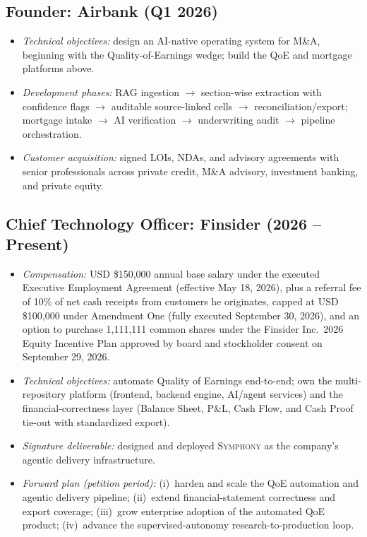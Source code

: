 \documentclass[11pt]{article}
\theoremstyle{plain}
\theoremstyle{definition}
\begin{document}
\subsection{Founder: Airbank (Q1 2026)}
\begin{itemize}
  \item \textit{Technical objectives:} design an AI-native operating system for M\&A,
  beginning with the Quality-of-Earnings wedge; build the QoE and mortgage platforms above.
  \item \textit{Development phases:} RAG ingestion $\rightarrow$ section-wise extraction with
  confidence flags $\rightarrow$ auditable source-linked cells $\rightarrow$
  reconciliation/export; mortgage intake $\rightarrow$ AI verification $\rightarrow$
  underwriting audit $\rightarrow$ pipeline orchestration.
  \item \textit{Customer acquisition:} signed LOIs, NDAs, and advisory agreements with
  senior professionals across private credit, M\&A advisory, investment banking, and private
  equity.
\end{itemize}

\subsection{Chief Technology Officer: Finsider (2026 -- Present)}
\begin{itemize}
  \item \textit{Compensation:} USD \$150{,}000 annual base salary under the executed
        Executive Employment Agreement (effective May 18, 2026), plus a referral fee of
        10\% of net cash receipts from customers he originates, capped at USD \$100{,}000
        under Amendment One (fully executed September 30, 2026), and an option to purchase
        1{,}111{,}111 common shares under the Finsider Inc.\ 2026 Equity Incentive Plan
        approved by board and stockholder consent on September 29, 2026.
  \item \textit{Technical objectives:} automate Quality of Earnings end-to-end; own the
  multi-repository platform (frontend, backend engine, AI/agent services) and the
  financial-correctness layer (Balance Sheet, P\&L, Cash Flow, and Cash Proof tie-out with
  standardized export).
  \item \textit{Signature deliverable:} designed and deployed \textsc{Symphony} as the
  company's agentic delivery infrastructure.
  \item \textit{Forward plan (petition period):} (i)~harden and scale the QoE automation and
  agentic delivery pipeline; (ii)~extend financial-statement correctness and export
  coverage; (iii)~grow enterprise adoption of the automated QoE product; (iv)~advance the
  supervised-autonomy research-to-production loop.
\end{itemize}
\end{document}
